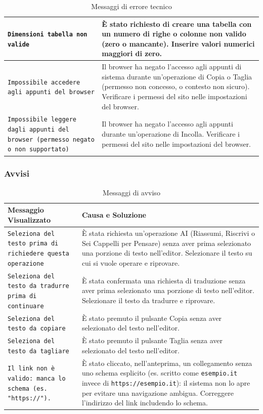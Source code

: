 \begin{table}[H]
\begin{tabularx}{\textwidth}{|X|X|}
    \hline
    \texttt{Dimensioni tabella non valide} & È stato richiesto di creare una tabella con un numero di righe o colonne non valido (zero o mancante). Inserire valori numerici maggiori di zero. \\
    \hline
    \texttt{Impossibile accedere agli appunti del browser} & Il browser ha negato l'accesso agli appunti di sistema durante un'operazione di Copia o Taglia (permesso non concesso, o contesto non sicuro). Verificare i permessi del sito nelle impostazioni del browser. \\
    \hline
    \texttt{Impossibile leggere dagli appunti del browser (permesso negato o non supportato)} & Il browser ha negato l'accesso agli appunti durante un'operazione di Incolla. Verificare i permessi del sito nelle impostazioni del browser. \\
    \hline
\end{tabularx}
\caption{Messaggi di errore tecnico}
\label{tab:errori-tecnici}
\end{table}

\subsubsection{Avvisi}
\renewcommand{\arraystretch}{1.3}
\begin{table}[H]
\begin{tabularx}{\textwidth}{|X|X|}
    \hline
    \rowcolor{primarycolor!10}
    \textbf{Messaggio Visualizzato} & \textbf{Causa e Soluzione} \\
    \hline
    \texttt{Seleziona del testo prima di richiedere questa operazione} & È stata richiesta un'operazione AI (Riassumi, Riscrivi o Sei Cappelli per Pensare) senza aver prima selezionato una porzione di testo nell'editor. Selezionare il testo su cui si vuole operare e riprovare. \\
    \hline
    \texttt{Seleziona del testo da tradurre prima di continuare} & È stata confermata una richiesta di traduzione senza aver prima selezionato una porzione di testo nell'editor. Selezionare il testo da tradurre e riprovare. \\
    \hline
    \texttt{Seleziona del testo da copiare} & È stato premuto il pulsante Copia senza aver selezionato del testo nell'editor. \\
    \hline
    \texttt{Seleziona del testo da tagliare} & È stato premuto il pulsante Taglia senza aver selezionato del testo nell'editor. \\
    \hline
    \texttt{Il link non è valido: manca lo schema (es. "https://").} & È stato cliccato, nell'anteprima, un collegamento senza uno schema esplicito (es. scritto come \texttt{esempio.it} invece di \texttt{https://esempio.it}): il sistema non lo apre per evitare una navigazione ambigua. Correggere l'indirizzo del link includendo lo schema. \\
    \hline
\end{tabularx}
\caption{Messaggi di avviso}
\label{tab:avvisi}
\end{table}

